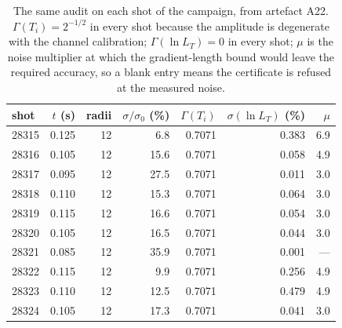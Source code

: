 \begin{table}[htbp]
\centering
\caption{The same audit on each shot of the campaign, from artefact A22. $\Gamma(T_i)=2^{-1/2}$ in every shot because the amplitude is degenerate with the channel calibration; $\Gamma(\ln L_T)=0$ in every shot; $\mu$ is the noise multiplier at which the gradient-length bound would leave the required accuracy, so a blank entry means the certificate is refused at the measured noise.}
\label{tab:mastmap}
\small
\begin{tabular}{@{}lrrrrrr@{}}
\toprule
shot & $t$ (s) & radii & $\sigma/\sigma_0$ (\%) & $\Gamma(T_i)$ & $\sigma(\ln L_T)$ (\%) & $\mu$ \\
\midrule
28315 & 0.125 & 12 & 6.8 & 0.7071 & 0.383 & 6.9 \\
28316 & 0.105 & 12 & 15.6 & 0.7071 & 0.058 & 4.9 \\
28317 & 0.095 & 12 & 27.5 & 0.7071 & 0.011 & 3.0 \\
28318 & 0.110 & 12 & 15.3 & 0.7071 & 0.064 & 3.0 \\
28319 & 0.115 & 12 & 16.6 & 0.7071 & 0.054 & 3.0 \\
28320 & 0.105 & 12 & 16.5 & 0.7071 & 0.044 & 3.0 \\
28321 & 0.085 & 12 & 35.9 & 0.7071 & 0.001 & --- \\
28322 & 0.115 & 12 & 9.9 & 0.7071 & 0.256 & 4.9 \\
28323 & 0.110 & 12 & 12.5 & 0.7071 & 0.479 & 4.9 \\
28324 & 0.105 & 12 & 17.3 & 0.7071 & 0.041 & 3.0 \\
\bottomrule
\end{tabular}
\end{table}
